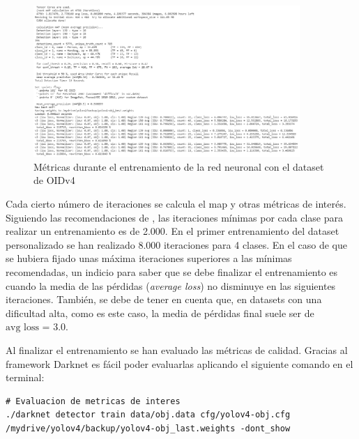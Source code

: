 \begin{figure}[ht]
\centering
\includegraphics[width=0.9\textwidth]{img/chapters/desarrollo/metrics-during-training.png}
\caption{\label{fig:metrics-during-train}Métricas durante el entrenamiento de la red neuronal con el dataset de OIDv4}
\end{figure}

Cada cierto número de iteraciones se calcula el \gls{map} y otras métricas de interés. Siguiendo las recomendaciones de \cite{yolov4-darknet-github}, las iteraciones mínimas por cada clase para realizar un entrenamiento es de 2.000. En el primer entrenamiento del dataset personalizado se han realizado 8.000 iteraciones para 4 clases. En el caso de que se hubiera fijado unas máxima iteraciones superiores a las mínimas recomendadas, un indicio para saber que se debe finalizar el entrenamiento es cuando la media de las pérdidas (\textit{average loss}) no disminuye en las siguientes iteraciones. También, se debe de tener en cuenta que, en datasets con una dificultad alta, como es este caso, la media de pérdidas final suele ser de $\text{avg loss = 3.0}$.

Al finalizar el entrenamiento se han evaluado las métricas de calidad. Gracias al framework Darknet \cite{darknet13} es fácil poder evaluarlas aplicando el siguiente comando en el terminal:

\vspace{0.5cm}
\begin{lstlisting}[language=iPython,caption=Evaluación métricas de calidad del dataset utilizado para el entrenamiento de la red neuronal de detección de objetos,captionpos=b,label={lst:darknet-map}]
# Evaluacion de metricas de interes
./darknet detector train data/obj.data cfg/yolov4-obj.cfg /mydrive/yolov4/backup/yolov4-obj_last.weights -dont_show
\end{lstlisting}

